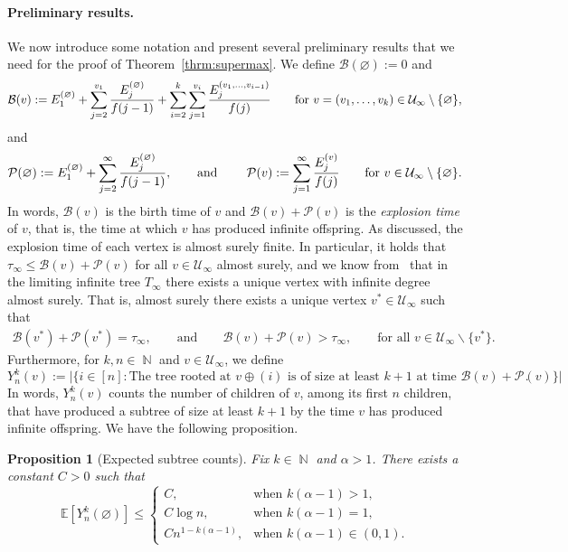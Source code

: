 \documentclass[11pt]{article}
\numberwithin{equation}{section}
\DeclareMathOperator{\N}{\mathbb{N}} %
\newcommand{\E}{\mathbb{E}} %
\newcommand{\be}{\begin{equation}}
\newcommand{\ee}{\end{equation}}
\def\cB{{\mathcal B}}
\def\cP{{\mathcal P}}
\def\cU{{\mathcal U}}
\newtheorem{proposition}[theorem]{Proposition}
\theoremstyle{definition}
\begin{document}
\paragraph{Preliminary results.} We now introduce some notation and present several preliminary results that we need for the proof of Theorem~\ref{thrm:supermax}. We define  
$\cB(\varnothing):=0$ and 
\be 
\cB(v):=E^{(\varnothing)}_1+\sum_{j=2}^{v_1}\frac{E^{(\varnothing)}_j}{f(j-1)}+\sum_{i=2}^k \sum_{j=1}^{v_i}\frac{E^{\scriptsize (v_1, \ldots, v_{i-1})}_j}{f(j)} \qquad \text{for }v=(v_1,\ldots, v_k)\in \cU_\infty\setminus\{\varnothing\},
\ee 
and 
\be 
\cP(\varnothing):=E^{(\varnothing)}_1+\sum_{j=2}^\infty \frac{E^{(\varnothing)}_j}{f(j-1)}, \qquad\text{and}\qquad \ \cP(v):=\sum_{j=1}^\infty \frac{E^{\scriptsize (v)}_j}{f(j)}\qquad \text{for }v\in \cU_\infty\setminus\{\varnothing\}. 
\ee 
In words, $\cB(v)$ is the birth time of $v$ and $\cB(v)+\cP(v)$ is the \emph{explosion time} of $v$, that is, the time at which $v$ has produced infinite offspring. As discussed, the explosion time of each vertex is almost surely finite. In particular, it holds that $\tau_\infty\leq \cB(v)+\cP(v)$ for all $v\in \cU_\infty$ almost surely, and we know from~\cite[Theorem $1.2$]{oliveira2005connectivity} that in the limiting infinite tree $T_\infty$ there exists a unique vertex with infinite degree almost surely. That is, almost surely there exists a unique vertex $v^*\in \cU_\infty$ such that 
\begin{align}
    \cB(v^*)+\cP(v^*)=\tau_\infty,\qquad \text{and}\qquad
    \cB(v)+\cP(v)>\tau_\infty, \qquad \text{for all } v\in \cU_\infty\backslash \{v^*\}.
\end{align}
Furthermore, for $k,n\in\N$ and $v \in \cU_\infty$, we define 
\be 
Y_n^k(v):=|\{i\in[n]: \text{The tree rooted at $v\oplus(i)$ is of size at least $k+1$ at time $\cB(v)+\cP(v)$}\}|.
\ee 
In words, $Y_n^k(v)$ counts the number of children of $v$, among its first $n$ children, that have produced a subtree of size at least $k+1$ by the time $v$ has produced infinite offspring. We have the following proposition.

\begin{proposition}[Expected subtree counts]\label{prop:subtree}
    Fix $k\in\N$ and $\alpha>1$. There exists a constant $C>0$ such that  
    \be
    \E[Y^k_n(\varnothing)]\leq \begin{cases} C, &\mbox{when } k(\alpha-1)>1, \\
    C\log n, &\mbox{when }  k(\alpha-1)=1,\\ 
    Cn^{1-k(\alpha-1)}, &\mbox{when }  k(\alpha-1)\in (0,1).
    \end{cases}
    \ee  
\end{proposition}
\end{document}
